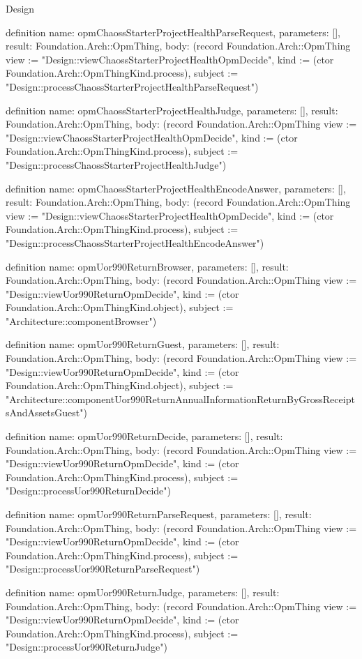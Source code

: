 \begin{lexlean}{Design}
\begin{semanticmodule}
definition{
  name: opmChaossStarterProjectHealthParseRequest,
  parameters: [],
  result: Foundation.Arch::OpmThing,
  body: (record Foundation.Arch::OpmThing {view := "Design::viewChaossStarterProjectHealthOpmDecide", kind := (ctor Foundation.Arch::OpmThingKind.process), subject := "Design::processChaossStarterProjectHealthParseRequest"})
}

definition{
  name: opmChaossStarterProjectHealthJudge,
  parameters: [],
  result: Foundation.Arch::OpmThing,
  body: (record Foundation.Arch::OpmThing {view := "Design::viewChaossStarterProjectHealthOpmDecide", kind := (ctor Foundation.Arch::OpmThingKind.process), subject := "Design::processChaossStarterProjectHealthJudge"})
}

definition{
  name: opmChaossStarterProjectHealthEncodeAnswer,
  parameters: [],
  result: Foundation.Arch::OpmThing,
  body: (record Foundation.Arch::OpmThing {view := "Design::viewChaossStarterProjectHealthOpmDecide", kind := (ctor Foundation.Arch::OpmThingKind.process), subject := "Design::processChaossStarterProjectHealthEncodeAnswer"})
}

definition{
  name: opmUor990ReturnBrowser,
  parameters: [],
  result: Foundation.Arch::OpmThing,
  body: (record Foundation.Arch::OpmThing {view := "Design::viewUor990ReturnOpmDecide", kind := (ctor Foundation.Arch::OpmThingKind.object), subject := "Architecture::componentBrowser"})
}

definition{
  name: opmUor990ReturnGuest,
  parameters: [],
  result: Foundation.Arch::OpmThing,
  body: (record Foundation.Arch::OpmThing {view := "Design::viewUor990ReturnOpmDecide", kind := (ctor Foundation.Arch::OpmThingKind.object), subject := "Architecture::componentUor990ReturnAnnualInformationReturnByGrossReceiptsAndAssetsGuest"})
}

definition{
  name: opmUor990ReturnDecide,
  parameters: [],
  result: Foundation.Arch::OpmThing,
  body: (record Foundation.Arch::OpmThing {view := "Design::viewUor990ReturnOpmDecide", kind := (ctor Foundation.Arch::OpmThingKind.process), subject := "Design::processUor990ReturnDecide"})
}

definition{
  name: opmUor990ReturnParseRequest,
  parameters: [],
  result: Foundation.Arch::OpmThing,
  body: (record Foundation.Arch::OpmThing {view := "Design::viewUor990ReturnOpmDecide", kind := (ctor Foundation.Arch::OpmThingKind.process), subject := "Design::processUor990ReturnParseRequest"})
}

definition{
  name: opmUor990ReturnJudge,
  parameters: [],
  result: Foundation.Arch::OpmThing,
  body: (record Foundation.Arch::OpmThing {view := "Design::viewUor990ReturnOpmDecide", kind := (ctor Foundation.Arch::OpmThingKind.process), subject := "Design::processUor990ReturnJudge"})
}


\end{semanticmodule}
\end{lexlean}
